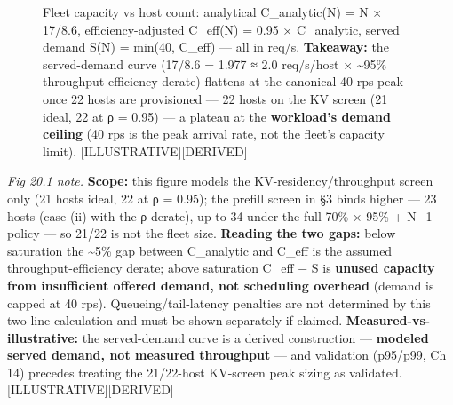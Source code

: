 {\intextsep=6pt\relax\begin{figure}[H]
\centering
{}
\caption[Fleet capacity vs host count]{Fleet capacity vs host count: analytical C\_analytic(N) = N × 17/8.6, efficiency-adjusted C\_eff(N) = 0.95 × C\_analytic, served demand S(N) = min(40, C\_eff) --- all in req/s. \textbf{Takeaway:} the served-demand curve (17/8.6 = 1.977 ≈ 2.0 req/s/host × \textasciitilde95\% throughput-efficiency derate) flattens at the canonical 40 rps peak once 22 hosts are provisioned --- 22 hosts on the KV screen (21 ideal, 22 at ρ = 0.95) --- a plateau at the \textbf{workload's demand ceiling} (40 rps is the peak arrival rate, not the fleet's capacity limit). \mbox{{[}ILLUSTRATIVE{]}}\hspace{0pt}\mbox{{[}DERIVED{]}}}

\label{fig:20.1}\end{figure}

\emph{\hyperref[fig:20.1]{Fig 20.1} note.} \textbf{Scope:} this figure models the
KV-residency/throughput screen only (21 hosts ideal, 22 at ρ = 0.95);
the prefill screen in §3 binds higher --- 23 hosts (case (ii) with the ρ
derate), up to 34 under the full 70\% × 95\% + N−1 policy --- so 21/22
is not the fleet size. \textbf{Reading the two gaps:} below saturation
the \textasciitilde5\% gap between C\_analytic and C\_eff is the assumed
throughput-efficiency derate; above saturation C\_eff − S is
\textbf{unused capacity from insufficient offered demand, not scheduling
overhead} (demand is capped at 40 rps). Queueing/tail-latency penalties
are not determined by this two-line calculation and must be shown
separately if claimed. \textbf{Measured-vs-illustrative:} the
served-demand curve is a derived construction --- \textbf{modeled served
demand, not measured throughput} --- and validation (p95/p99, Ch 14)
precedes treating the 21/22-host KV-screen peak sizing as validated.
\mbox{{[}ILLUSTRATIVE{]}}\hspace{0pt}\mbox{{[}DERIVED{]}}

}
